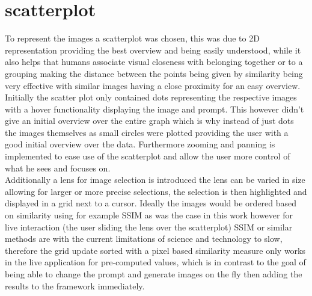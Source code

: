 \documentclass[
  a4paper,  %
  twoside,  %
  bibliography=totoc,
  headsepline,
  cleardoublepage=empty,
  parskip=half,
  draft=false
]{scrbook}
\begin{document}
\section{scatterplot}
To represent the images a scatterplot was chosen, this was due to 2D representation providing the best overview and being easily understood, while it also helps that humans associate visual closeness with belonging together or to a grouping making the distance between the points being given by similarity being very effective with similar images having a close proximity for an easy overview. Initially the scatter plot only contained dots representing the respective images with a hover functionality displaying the image and prompt. This however didn't give an initial overview over the entire graph which is why instead of just dots the images themselves as small circles were plotted providing the user with a good initial overview over the data. Furthermore zooming and panning is implemented to ease use of the scatterplot and allow the user more control of what he sees and focuses on.
\\Additionally a lens for image selection is introduced the lens can be varied in size allowing for larger or more precise selections, the selection is then highlighted and displayed in a grid next to a cursor. Ideally the images would be ordered based on similarity using for example SSIM as was the case in this work however for live interaction (the user sliding the lens over the scatterplot) SSIM or similar methods are with the current limitations of science and technology to slow, therefore the grid update sorted with a pixel based similarity measure only works in the live application for pre-computed values, which is in contrast to the goal of being able to change the prompt and generate images on the fly then adding the results to the framework immediately.
\end{document}
